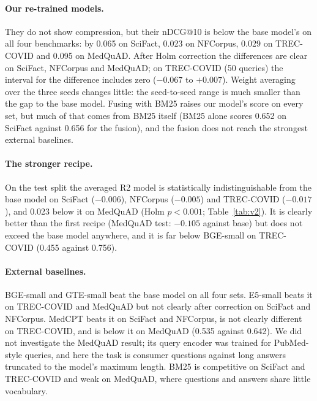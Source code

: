 \documentclass[11pt]{article}
\begin{document}
\paragraph{Our re-trained models.} They do not show compression, but their nDCG@10 is below the base model's on all four benchmarks: by 0.065 on SciFact, 0.023 on NFCorpus, 0.029 on TREC-COVID and 0.095 on MedQuAD. After Holm correction the differences are clear on SciFact, NFCorpus and MedQuAD; on TREC-COVID (50 queries) the interval for the difference includes zero ($-0.067$ to $+0.007$). Weight averaging over the three seeds changes little: the seed-to-seed range is much smaller than the gap to the base model. Fusing with BM25 raises our model's score on every set, but much of that comes from BM25 itself (BM25 alone scores 0.652 on SciFact against 0.656 for the fusion), and the fusion does not reach the strongest external baselines.

\paragraph{The stronger recipe.} On the test split the averaged R2 model is statistically indistinguishable from the base model on SciFact ($-0.006$), NFCorpus ($-0.005$) and TREC-COVID ($-0.017$), and 0.023 below it on MedQuAD (Holm $p<0.001$; Table~\ref{tab:v2}). It is clearly better than the first recipe (MedQuAD test: $-0.105$ against base) but does not exceed the base model anywhere, and it is far below BGE-small on TREC-COVID (0.455 against 0.756).

\begin{table}[t]\centering\small

\caption{Test-split nDCG@10 for the base model, the first recipe, the stronger recipe (both averaged over three seeds) and BGE-small. MedQuAD uses the six test sources (4,599 queries).}\label{tab:v2}
\end{table}

\paragraph{External baselines.} BGE-small and GTE-small beat the base model on all four sets. E5-small beats it on TREC-COVID and MedQuAD but not clearly after correction on SciFact and NFCorpus. MedCPT beats it on SciFact and NFCorpus, is not clearly different on TREC-COVID, and is below it on MedQuAD (0.535 against 0.642). We did not investigate the MedQuAD result; its query encoder was trained for PubMed-style queries, and here the task is consumer questions against long answers truncated to the model's maximum length. BM25 is competitive on SciFact and TREC-COVID and weak on MedQuAD, where questions and answers share little vocabulary.
\end{document}
